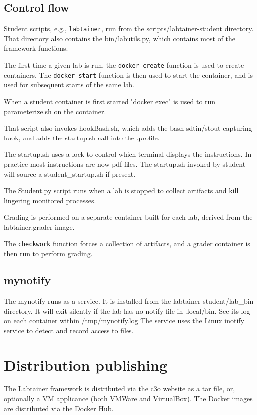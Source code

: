 \documentclass[12pt]{article}
\begin{document}
\subsection{Control flow}
Student scripts, e.g., {\tt labtainer}, run from the scripts/labtainer-student directory.
That directory also contains the bin/labutils.py, which contains most of the framework
functions.

The first time a given lab is run, the {\tt docker create} function is
used to create containers.  The {\tt docker start} function is then used to start
the container, and is used for subsequent starts of the same lab.

When a student container is first started "docker exec" is used
to run parameterize.sh on the container.

That script also invokes hookBash.sh, which adds the bash
sdtin/stout capturing hook, and adds the startup.sh call
into the .profile.

The startup.sh uses a lock to control which
terminal displays the instructions.  In practice most
instructions are now pdf files.
The startup.sh invoked by student will source a student\_startup.sh if present.

The Student.py script runs when a lab is stopped to collect artifacts and kill lingering
monitored processes.

Grading is performed on a separate container built for each lab, derived from the 
labtainer.grader image.

The {\tt checkwork} function forces a collection of artifacts, and a grader container
is then run to perform grading.

\subsection{mynotify}
The mynotify runs as a service.  It is installed from the labtainer-student/lab\_bin directory.
It will exit silently if the lab has no notify file in .local/bin.  See its log on each container
within /tmp/mynotify.log  The service uses the Linux inotify service to detect and record access to files.

\section{Distribution publishing}
The Labtainer framework is distributed via the c3o website as a tar file, or, optionally a
VM applicance (both VMWare and VirtualBox).  The Docker images are distributed via the Docker Hub.
\end{document}

